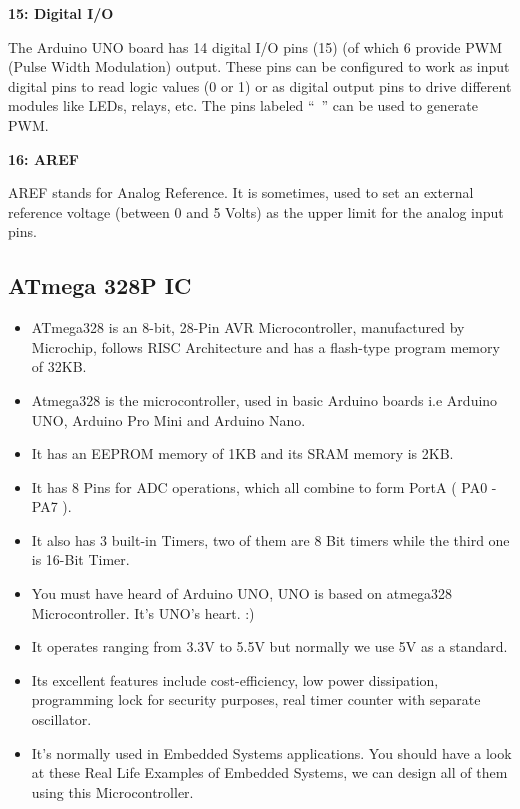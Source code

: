 \textbf{15: Digital I/O}\vspace{.3cm}

The Arduino UNO board has 14 digital I/O pins (15) (of which 6 provide PWM (Pulse Width Modulation) output. These pins can be configured to work as input digital pins to read logic values (0 or 1) or as digital output pins to drive different modules like LEDs, relays, etc. The pins labeled “~” can be used to generate PWM.\vspace{.3cm}

\textbf{16: AREF}\vspace{.3cm}

AREF stands for Analog Reference. It is sometimes, used to set an external reference voltage (between 0 and 5 Volts) as the upper limit for the analog input pins.


\subsection{ATmega 328P IC}
\begin{itemize}
	\item ATmega328 is an 8-bit, 28-Pin AVR Microcontroller, manufactured by Microchip, follows RISC Architecture and has a flash-type program memory of 32KB.
	\item Atmega328 is the microcontroller, used in basic Arduino boards i.e Arduino UNO, Arduino Pro Mini and Arduino Nano.
	\item It has an EEPROM memory of 1KB and its SRAM memory is 2KB.
	\item It has 8 Pins for ADC operations, which all combine to form PortA ( PA0 - PA7 ).
	\item It also has 3 built-in Timers, two of them are 8 Bit timers while the third one is 16-Bit Timer.
	\item You must have heard of Arduino UNO, UNO is based on atmega328 Microcontroller. It's UNO's heart. :)
	\item It operates ranging from 3.3V to 5.5V but normally we use 5V as a standard.
	\item Its excellent features include cost-efficiency, low power dissipation, programming lock for security purposes, real timer counter with separate oscillator.
	\item It's normally used in Embedded Systems applications. You should have a look at these Real Life Examples of Embedded Systems, we can design all of them using this Microcontroller.
\end{itemize}

